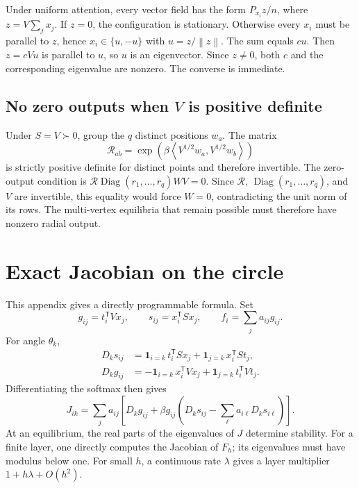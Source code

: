 \documentclass[11pt,a4paper]{article}
\theoremstyle{definition}
\newcommand{\Diag}{\operatorname{Diag}}
\newcommand{\T}{\mathsf T}
\newcommand{\norm}[1]{\left\lVert #1\right\rVert}
\newcommand{\ip}[2]{\left\langle #1,#2\right\rangle}
\begin{document}
Under uniform attention, every vector field has the form $P_{x_i}z/n$, where
$z=V\sum_jx_j$. If $z=0$, the configuration is stationary. Otherwise every $x_i$ must
be parallel to $z$, hence $x_i\in\{u,-u\}$ with $u=z/\norm z$. The sum equals $cu$.
Then $z=cVu$ is parallel to $u$, so $u$ is an eigenvector. Since $z\neq0$, both $c$ and
the corresponding eigenvalue are nonzero. The converse is immediate.

\subsection{No zero outputs when \texorpdfstring{$V$}{V} is positive definite}

Under $S=V\succ0$, group the $q$ distinct positions $w_a$. The matrix
\[
 \mathcal R_{ab}=\exp\!\left(\beta
 \ip{V^{1/2}w_a}{V^{1/2}w_b}\right)
\]
is strictly positive definite for distinct points and therefore invertible. The
zero-output condition is
$\mathcal R\Diag(r_1,\ldots,r_q)WV=0$. Since
$\mathcal R$, $\Diag(r_1,\ldots,r_q)$, and $V$ are invertible, this equality would
force $W=0$, contradicting the unit norm of its rows. The multi-vertex equilibria that
remain possible must therefore have nonzero radial output.

\section{Exact Jacobian on the circle}
\label{app:jacobian}

This appendix gives a directly programmable formula. Set
\[
 g_{ij}=t_i^{\T}Vx_j,\qquad s_{ij}=x_i^{\T}Sx_j,\qquad
 f_i=\sum_j a_{ij}g_{ij}.
\]
For angle $\theta_k$,
\begin{align}
 D_k s_{ij}
 &=\mathbf 1_{i=k}\,t_i^{\T}Sx_j
 +\mathbf 1_{j=k}\,x_i^{\T}St_j,\\
 D_k g_{ij}
 &=-\mathbf 1_{i=k}\,x_i^{\T}Vx_j
 +\mathbf 1_{j=k}\,t_i^{\T}Vt_j.
\end{align}
Differentiating the softmax then gives
\begin{equation}
 \boxed{
 J_{ik}=\sum_j a_{ij}\left[
 D_k g_{ij}+\beta g_{ij}
 \left(D_k s_{ij}-\sum_\ell a_{i\ell}D_k s_{i\ell}\right)
 \right].}                                                \label{eq:circle-jacobian}
\end{equation}
At an equilibrium, the real parts of the eigenvalues of $J$ determine stability. For a
finite layer, one directly computes the Jacobian of $F_h$; its eigenvalues must have
modulus below one. For small $h$, a continuous rate $\lambda$ gives a layer multiplier
$1+h\lambda+O(h^2)$.
\end{document}
